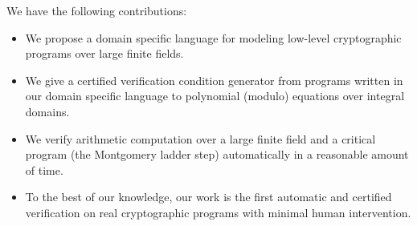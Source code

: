 We have the following contributions:
\begin{itemize}
\item We propose a domain specific language for modeling low-level
  cryptographic programs over large finite fields.
\item We give a certified verification condition generator from
  programs written in our domain specific language to polynomial
  (modulo) equations over integral domains.
\item We verify arithmetic computation over a large finite field and a
  critical program (the Montgomery ladder step) automatically in a
  reasonable amount of time.  
\item To the best of our knowledge, our work is the first automatic
  and certified verification on real cryptographic programs with
  minimal human intervention.
\end{itemize}

